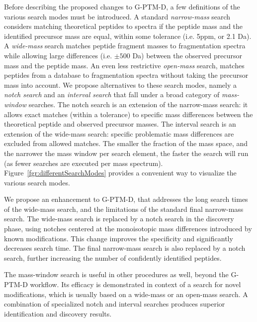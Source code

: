 \documentclass[journal=jprobs,manuscript=article]{achemso}
\begin{document}
Before describing the proposed changes to G-PTM-D, a few definitions of the various search modes must be introduced.
A standard \textit{narrow-mass} search considers matching theoretical peptides to spectra if the peptide mass and the identified precursor mass are equal, within some tolerance (i.e. 5ppm, or 2.1 Da).
A \textit{wide-mass} search matches peptide fragment masses to fragmentation spectra while allowing large differences (i.e. $\pm 500$ Da) between the observed precursor mass and the peptide mass.
An even less restrictive \textit{open-mass} search, matches peptides from a database to fragmentation spectra without taking the precursor mass into account.
We propose alternatives to these search modes, namely a \textit{notch search} and an \textit{interval search} that fall under a broad category of \textit{mass-window} searches.
The notch search is an extension of the narrow-mass search: it allows exact matches (within a tolerance) to specific mass differences between the theoretical peptide and observed precursor masses.
The interval search is an extension of the wide-mass search: specific problematic mass differences are excluded from allowed matches.
The smaller the fraction of the mass space, and the narrower the mass window per search element, the faster the search will run (as fewer searches are executed per mass spectrum).
Figure~\ref{fgr:differentSearchModes} provides a convenient way to visualize the various search modes.

We propose an enhancement to G-PTM-D, that addresses the long search times of the wide-mass search, and the limitations of the standard final narrow-mass search.
The wide-mass search is replaced by a notch search in the discovery phase, using notches centered at the monoisotopic mass differences introduced by known modifications.
This change improves the specificity and significantly decreases search time.
The final narrow-mass search is also replaced by a notch search, further increasing the number of confidently identified peptides.

The mass-window search is useful in other procedures as well, beyond the G-PTM-D workflow.
Its efficacy is demonstrated in context of a search for novel modifications, which is usually based on a wide-mass or an open-mass search.
A combination of specialized notch and interval searches produces superior identification and discovery results.
\end{document}
